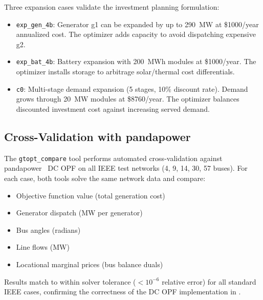 Three expansion cases validate the investment planning formulation:

\begin{itemize}
  \item \texttt{exp\_gen\_4b}: Generator g1 can be expanded by up to
    290~MW at \$1000/year annualized cost.  The optimizer adds capacity
    to avoid dispatching expensive g2.
  \item \texttt{exp\_bat\_4b}: Battery expansion with 200~MWh modules
    at \$1000/year.  The optimizer installs storage to arbitrage
    solar/thermal cost differentials.
  \item \texttt{c0}: Multi-stage demand expansion (5 stages, 10\%
    discount rate).  Demand grows through 20~MW modules at
    \$8760/year.  The optimizer balances discounted investment cost
    against increasing served demand.
\end{itemize}

\subsection{Cross-Validation with pandapower}

The \texttt{gtopt\_compare} tool performs automated cross-validation
against pandapower~\cite{thurner2018pandapower} DC OPF on all IEEE test
networks (4, 9, 14, 30, 57 buses).  For each case, both tools solve the
same network data and compare:

\begin{itemize}
  \item Objective function value (total generation cost)
  \item Generator dispatch (MW per generator)
  \item Bus angles (radians)
  \item Line flows (MW)
  \item Locational marginal prices (bus balance duals)
\end{itemize}

Results match to within solver tolerance ($<10^{-6}$ relative error)
for all standard IEEE cases, confirming the correctness of the DC OPF
implementation in \gtopt{}.
